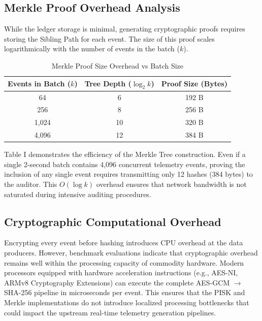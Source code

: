 \documentclass[conference]{IEEEtran}
\begin{document}
\subsection{Merkle Proof Overhead Analysis}
While the ledger storage is minimal, generating cryptographic proofs requires storing the Sibling Path for each event. The size of this proof scales logarithmically with the number of events in the batch ($k$).

\begin{table}[htbp]
\caption{Merkle Proof Size Overhead vs Batch Size}
\begin{center}
\begin{tabular}{ccc}
\toprule
\textbf{Events in Batch ($k$)} & \textbf{Tree Depth ($\log_2 k$)} & \textbf{Proof Size (Bytes)} \\
\midrule
64 & 6 & 192 B \\
256 & 8 & 256 B \\
1,024 & 10 & 320 B \\
4,096 & 12 & 384 B \\
\bottomrule
\end{tabular}
\end{center}
\end{table}

Table I demonstrates the efficiency of the Merkle Tree construction. Even if a single 2-second batch contains 4,096 concurrent telemetry events, proving the inclusion of any single event requires transmitting only 12 hashes (384 bytes) to the auditor. This $O(\log k)$ overhead ensures that network bandwidth is not saturated during intensive auditing procedures.

\subsection{Cryptographic Computational Overhead}
Encrypting every event before hashing introduces CPU overhead at the data producers. However, benchmark evaluations indicate that cryptographic overhead remains well within the processing capacity of commodity hardware. Modern processors equipped with hardware acceleration instructions (e.g., AES-NI, ARMv8 Cryptography Extensions) can execute the complete AES-GCM $\to$ SHA-256 pipeline in microseconds per event. This ensures that the PISK and Merkle implementations do not introduce localized processing bottlenecks that could impact the upstream real-time telemetry generation pipelines.

\end{document}
